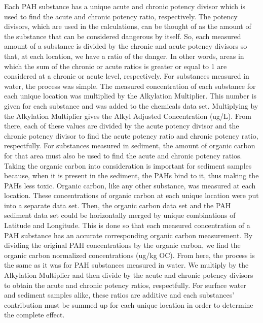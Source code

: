 \documentclass[11pt]{article}
\begin{document}
Each PAH substance has a unique acute and chronic potency divisor which is used to find the acute and chronic potency ratio, respectively. The potency divisors, which are used in the calculations, can be thought of as the amount of the substance that can be considered dangerous by itself. So, each measured amount of a substance is divided by the chronic and acute potency divisors so that, at each location, we have a ratio of the danger. In other words, areas in which the sum of the chronic or acute ratios is greater or equal to 1 are considered at a chronic or acute level, respectively. For substances measured in water, the process was simple. The measured concentration of each substance for each unique location was multiplied by the Alkylation Multiplier. This number is given for
each substance and was added to the chemicals data set. Multiplying by the Alkylation Multiplier gives the Alkyl Adjusted Concentration (ug/L). From there, each of these values are divided by the acute potency divisor and the chronic potency divisor to find the acute potency ratio and chronic potency ratio, respectfully. For substances measured in sediment, the amount of organic carbon for that area must also be used to find the acute and chronic potency ratios. Taking the organic carbon into consideration is important for sediment samples because, when it is present in the sediment, the PAHs bind to it, thus making the PAHs less toxic. Organic carbon, like any other substance, was measured at each location. These concentrations of organic carbon at each unique location were put into a separate data set. Then, the organic carbon data set and the PAH sediment data set could be horizontally merged by unique combinations of Latitude and Longitude. This is done so that each measured concentration of a PAH substance has an accurate corresponding organic carbon measurement. By dividing the original PAH concentrations by the organic carbon, we find the organic carbon normalized concentrations (ug/kg OC). From here, the process is the same as it was for PAH substances measured in water. We multiply by the Alkylation Multiplier and then divide by the acute and chronic potency divisors to obtain the acute and chronic potency ratios, respectfully. For surface water and sediment samples alike, these ratios are additive and each substances' contribution must be summed up for each unique location in order to determine the complete effect.
\end{document}
